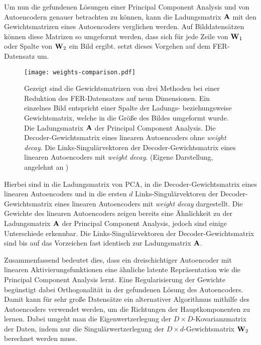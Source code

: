 Um nun die gefundenen Lösungen einer Principal Component Analysis und von Autoencodern genauer
betrachten zu können, kann die Ladungsmatrix $\mathbf{A}$ mit den Gewichtsmatrizen eines Autoencoders
verglichen werden. Auf Bilddatensätzen können diese Matrizen so umgeformt werden, dass sich für
jede Zeile von $\mathbf{W}_1$ oder Spalte von $\mathbf{W}_2$ ein Bild ergibt.
 setzt dieses Vorgehen auf dem FER-Datensatz um.
\begin{figure}[ht]
	\centering
	\texttt{[image: weights-comparison.pdf]}
	\caption[Die Gewichtsmatrizen von drei Methoden auf dem FER-Datensatz]{Gezeigt sind die Gewichtsmatrizen von drei Methoden bei einer Reduktion des FER-Datensatzes auf neun Dimensionen. Ein einzelnes Bild entspricht einer Spalte der Ladungs- beziehungsweise Gewichtsmatrix, welche in die Größe des Bildes umgeformt wurde. \captiona Die Ladungsmatrix $\mathbf{A}$ der Principal Component Analysis. \captionb Die Decoder-Gewichtsmatrix eines linearen Autoencoders ohne \textit{weight decay}. \captionc Die Links-Singulärvektoren der Decoder-Gewichtsmatrix eines linearen Autoencoders \captionb mit \textit{weight decay}. (Eigene Darstellung, angelehnt an \textcite[5]{Plaut.2018})}
	\label{fig:Gewichtsvergleich}
\end{figure}
Hierbei sind in  \captiona die Ladungsmatrix von PCA, in \captionb die Decoder-Gewichtsmatrix eines linearen Autoencoders und in \captionc die ersten $d$ Links-Singulärvektoren der Decoder-Gewichtsmatrix eines linearen Autoencoders mit \textit{weight decay} dargestellt.
Die Gewichte des linearen Autoencoders zeigen bereits eine Ähnlichkeit zu der Ladungsmatrix $\mathbf{A}$ der Principal Component Analysis, jedoch sind einige Unterschiede erkennbar. Die Links-Singulärvektoren der Decoder-Gewichtsmatrix sind bis auf das Vorzeichen fast identisch zur Ladungsmatrix $\mathbf{A}$.

Zusammenfassend bedeutet dies, dass ein dreischichtiger Autoencoder mit linearen
Aktivierungsfunktionen eine ähnliche latente Repräsentation wie die Principal Component Analysis
lernt. Eine Regularisierung der Gewichte begünstigt dabei Orthogonalität in der gefundenen Lösung
des Autoencoders. Damit kann für sehr große Datensätze ein alternativer Algorithmus mithilfe des
Autoencoders verwendet werden, um die Richtungen der Hauptkomponenten zu lernen. Dabei umgeht man
die Eigenwertzerlegung der $D \times D$-Kovarianzmatrix der Daten, indem nur die
Singulärwertzerlegung der $D \times d$-Gewichtsmatrix $\mathbf{W}_2$ berechnet werden muss.

